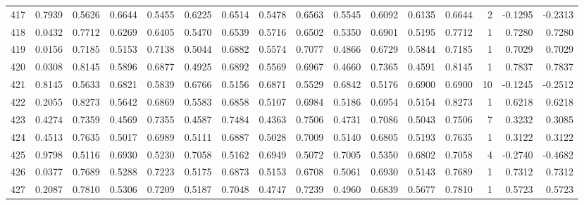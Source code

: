 \begin{tabular}{lrrrrrrrrrrrrrrr}
417 &      0.7939 &  0.5626 &  0.6644 &  0.5455 &  0.6225 &  0.6514 &  0.5478 &  0.6563 &  0.5545 &  0.6092 &   0.6135 &     0.6644 &      2 &                   -0.1295 &                    -0.2313 \\
418 &      0.0432 &  0.7712 &  0.6269 &  0.6405 &  0.5470 &  0.6539 &  0.5716 &  0.6502 &  0.5350 &  0.6901 &   0.5195 &     0.7712 &      1 &                    0.7280 &                     0.7280 \\
419 &      0.0156 &  0.7185 &  0.5153 &  0.7138 &  0.5044 &  0.6882 &  0.5574 &  0.7077 &  0.4866 &  0.6729 &   0.5844 &     0.7185 &      1 &                    0.7029 &                     0.7029 \\
420 &      0.0308 &  0.8145 &  0.5896 &  0.6877 &  0.4925 &  0.6892 &  0.5569 &  0.6967 &  0.4660 &  0.7365 &   0.4591 &     0.8145 &      1 &                    0.7837 &                     0.7837 \\
421 &      0.8145 &  0.5633 &  0.6821 &  0.5839 &  0.6766 &  0.5156 &  0.6871 &  0.5529 &  0.6842 &  0.5176 &   0.6900 &     0.6900 &     10 &                   -0.1245 &                    -0.2512 \\
422 &      0.2055 &  0.8273 &  0.5642 &  0.6869 &  0.5583 &  0.6858 &  0.5107 &  0.6984 &  0.5186 &  0.6954 &   0.5154 &     0.8273 &      1 &                    0.6218 &                     0.6218 \\
423 &      0.4274 &  0.7359 &  0.4569 &  0.7355 &  0.4587 &  0.7484 &  0.4363 &  0.7506 &  0.4731 &  0.7086 &   0.5043 &     0.7506 &      7 &                    0.3232 &                     0.3085 \\
424 &      0.4513 &  0.7635 &  0.5017 &  0.6989 &  0.5111 &  0.6887 &  0.5028 &  0.7009 &  0.5140 &  0.6805 &   0.5193 &     0.7635 &      1 &                    0.3122 &                     0.3122 \\
425 &      0.9798 &  0.5116 &  0.6930 &  0.5230 &  0.7058 &  0.5162 &  0.6949 &  0.5072 &  0.7005 &  0.5350 &   0.6802 &     0.7058 &      4 &                   -0.2740 &                    -0.4682 \\
426 &      0.0377 &  0.7689 &  0.5288 &  0.7223 &  0.5175 &  0.6873 &  0.5153 &  0.6708 &  0.5061 &  0.6930 &   0.5143 &     0.7689 &      1 &                    0.7312 &                     0.7312 \\
427 &      0.2087 &  0.7810 &  0.5306 &  0.7209 &  0.5187 &  0.7048 &  0.4747 &  0.7239 &  0.4960 &  0.6839 &   0.5677 &     0.7810 &      1 &                    0.5723 &                     0.5723 \\

\end{tabular}
